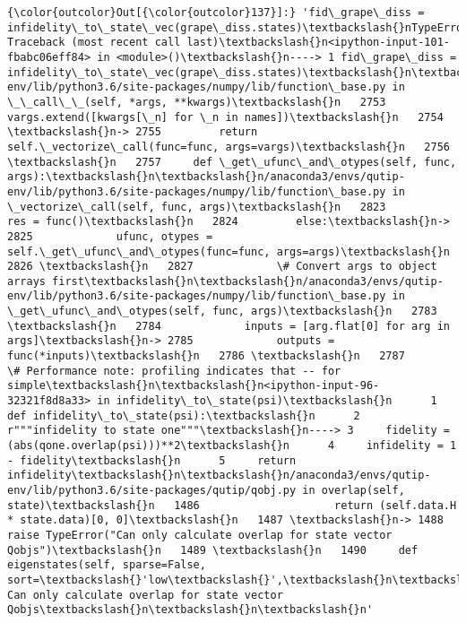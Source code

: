 \documentclass[11pt]{article}
\begin{document}
\begin{Verbatim}[commandchars=\\\{\}]
{\color{outcolor}Out[{\color{outcolor}137}]:} 'fid\_grape\_diss = infidelity\_to\_state\_vec(grape\_diss.states)\textbackslash{}nTypeError                                 Traceback (most recent call last)\textbackslash{}n<ipython-input-101-fbabc06eff84> in <module>()\textbackslash{}n----> 1 fid\_grape\_diss = infidelity\_to\_state\_vec(grape\_diss.states)\textbackslash{}n\textbackslash{}n/anaconda3/envs/qutip-env/lib/python3.6/site-packages/numpy/lib/function\_base.py in \_\_call\_\_(self, *args, **kwargs)\textbackslash{}n   2753             vargs.extend([kwargs[\_n] for \_n in names])\textbackslash{}n   2754 \textbackslash{}n-> 2755         return self.\_vectorize\_call(func=func, args=vargs)\textbackslash{}n   2756 \textbackslash{}n   2757     def \_get\_ufunc\_and\_otypes(self, func, args):\textbackslash{}n\textbackslash{}n/anaconda3/envs/qutip-env/lib/python3.6/site-packages/numpy/lib/function\_base.py in \_vectorize\_call(self, func, args)\textbackslash{}n   2823             res = func()\textbackslash{}n   2824         else:\textbackslash{}n-> 2825             ufunc, otypes = self.\_get\_ufunc\_and\_otypes(func=func, args=args)\textbackslash{}n   2826 \textbackslash{}n   2827             \# Convert args to object arrays first\textbackslash{}n\textbackslash{}n/anaconda3/envs/qutip-env/lib/python3.6/site-packages/numpy/lib/function\_base.py in \_get\_ufunc\_and\_otypes(self, func, args)\textbackslash{}n   2783 \textbackslash{}n   2784             inputs = [arg.flat[0] for arg in args]\textbackslash{}n-> 2785             outputs = func(*inputs)\textbackslash{}n   2786 \textbackslash{}n   2787             \# Performance note: profiling indicates that -- for simple\textbackslash{}n\textbackslash{}n<ipython-input-96-32321f8d8a33> in infidelity\_to\_state(psi)\textbackslash{}n      1 def infidelity\_to\_state(psi):\textbackslash{}n      2     r"""infidelity to state one"""\textbackslash{}n----> 3     fidelity = (abs(qone.overlap(psi)))**2\textbackslash{}n      4     infidelity = 1 - fidelity\textbackslash{}n      5     return infidelity\textbackslash{}n\textbackslash{}n/anaconda3/envs/qutip-env/lib/python3.6/site-packages/qutip/qobj.py in overlap(self, state)\textbackslash{}n   1486                     return (self.data.H * state.data)[0, 0]\textbackslash{}n   1487 \textbackslash{}n-> 1488         raise TypeError("Can only calculate overlap for state vector Qobjs")\textbackslash{}n   1489 \textbackslash{}n   1490     def eigenstates(self, sparse=False, sort=\textbackslash{}'low\textbackslash{}',\textbackslash{}n\textbackslash{}nTypeError: Can only calculate overlap for state vector Qobjs\textbackslash{}n\textbackslash{}n\textbackslash{}n'
\end{Verbatim}
            
\end{document}
